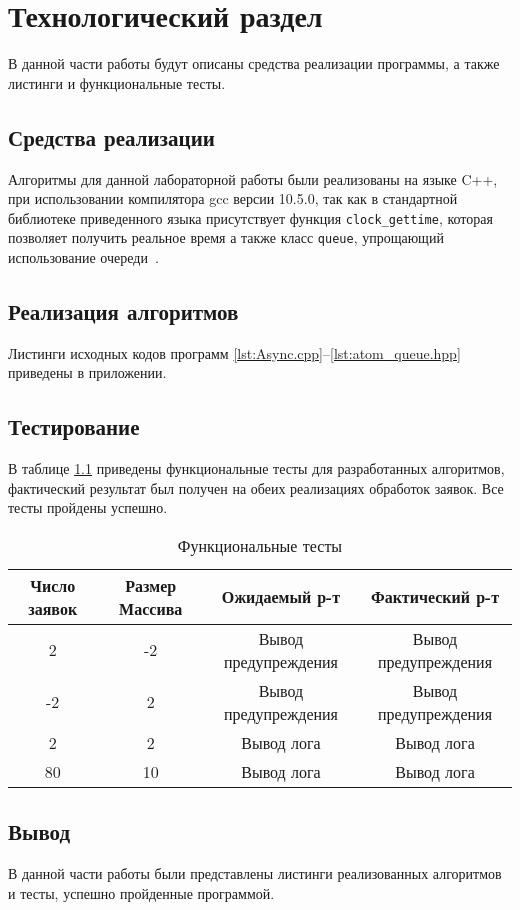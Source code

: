 \chapter{Технологический раздел}

В данной части работы будут описаны средства реализации программы, а также листинги и функциональные тесты.

\section{Средства реализации}
Алгоритмы для данной лабораторной работы были реализованы на языке C++, при использовании компилятора gcc версии 10.5.0, так как в стандартной библиотеке приведенного языка
присутствует функция \texttt{clock\_gettime}, которая  позволяет получить реальное время а также класс \texttt{queue}, упрощающий использование очереди~\cite{cpp-time,queue}.



\section{Реализация алгоритмов}
Листинги исходных кодов программ  \ref{lst:Async.cpp}--\ref{lst:atom_queue.hpp} приведены в приложении.


\section{Тестирование}

В таблице \ref{t:tests} приведены функциональные тесты для разработанных алгоритмов, фактический результат был получен на обеих реализациях обработок заявок. Все тесты пройдены успешно.
\begin{table}[ht]
	\small
	\begin{center}
			\caption{Функциональные тесты}
			\label{t:tests}
		\begin{tabular}{|c|c|c|c|}
			\hline
			Число заявок & Размер Массива & Ожидаемый р-т & Фактический р-т \\
			\hline
			2 & -2 & Вывод предупреждения & Вывод предупреждения \\ 	\hline
			-2 & 2 & Вывод предупреждения & Вывод предупреждения \\ \hline
			2 & 2 & Вывод лога & Вывод лога \\ \hline
			80 & 10 &  Вывод лога & Вывод лога \\ \hline
		\end{tabular}
	\end{center}
\end{table}

\section*{Вывод}
В данной части работы были представлены листинги реализованных алгоритмов и тесты, успешно пройденные программой.